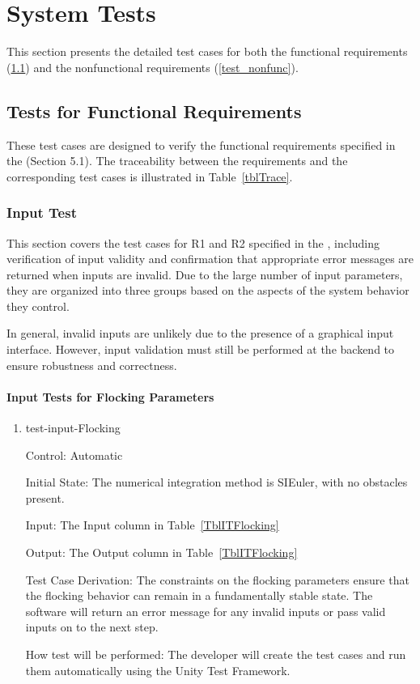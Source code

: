 \documentclass[12pt, titlepage]{article}
\begin{document}
\section{System Tests} \label{sec_systest}

This section presents the detailed test cases for both the functional 
requirements (\ref{test_func}) and the nonfunctional requirements (\ref{test_nonfunc}).

\subsection{Tests for Functional Requirements} \label{test_func}

These test cases are designed to verify the functional requirements specified 
in the \citet{SRS} (Section 5.1). The traceability between the requirements and 
the corresponding test cases is illustrated in Table~\ref{tblTrace}.

\subsubsection{Input Test} \label{inputTest}

This section covers the test cases for R1 and R2 specified in the \citet{SRS}, 
including verification of input validity and confirmation that appropriate 
error messages are returned when inputs are invalid. Due to the large number 
of input parameters, they are organized into three groups based on the aspects 
of the system behavior they control.

In general, invalid inputs are unlikely due to the presence of a graphical 
input interface. However, input validation must still be performed at the 
backend to ensure robustness and correctness.
		
\paragraph{Input Tests for Flocking Parameters}

\begin{enumerate}

\item{test-input-Flocking\\}

Control: Automatic
					
Initial State: The numerical integration method is SIEuler, with no obstacles 
present.
					
Input: The Input column in Table~\ref{TblITFlocking}
					
Output: The Output column in Table~\ref{TblITFlocking}

Test Case Derivation: The constraints on the flocking parameters ensure that 
the flocking behavior can remain in a fundamentally stable state. The software 
will return an error message for any invalid inputs or pass valid inputs on to 
the next step.
					
How test will be performed: The developer will create the test cases and run 
them automatically using the Unity Test Framework.
\end{enumerate}
\end{document}
